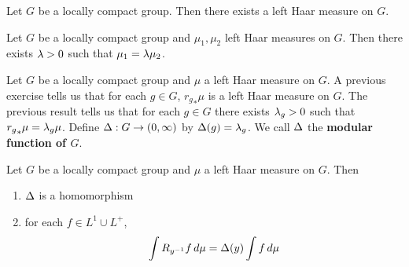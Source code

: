\documentclass{book}
\begin{document}
	\begin{thm}
		Let $G$ be a locally compact group. Then there exists a left Haar measure on $G$. 
	\end{thm}
	
	\begin{thm}
		Let $G$ be a locally compact group and $\mu_1, \mu_2$ left Haar measures on $G$. Then there exists $\lambda > 0$ such that $\mu_1 = \lambda \mu_2 $.
	\end{thm}
	
	\begin{defn}  
		Let $G$ be a locally compact group and $\mu$ a left Haar measure on $G$. A previous exercise tells us that for each $g \in G$, ${r_g}_*\mu$ is a left Haar measure on $G$. The previous result tells us that for each $g \in G$ there exists $\lambda_g >0$ such that ${r_g}_*\mu = \lambda_g \mu$. Define $\Delta: G \rightarrow (0, \infty)$ by $\Delta(g) = \lambda_g$. We call $\Delta$ the \textbf{modular function of $G$}. 
	\end{defn}

	\begin{ex}  
		Let $G$ be a locally compact group and $\mu$ a left Haar measure on $G$. Then 
		\begin{enumerate}
			\item $\Delta $ is a homomorphism 
			\item for each $f \in L^1 \cup L^+$, $$\int R_{y^{-1}} f \, d \mu = \Delta(y) \int f \, d \mu$$
		\end{enumerate}
	\end{ex}
\end{document}
